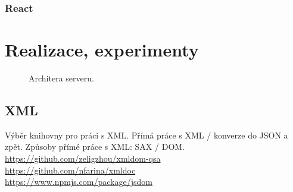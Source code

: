 \subsection{React}

\chapter{Realizace, experimenty}
\begin{figure}[h]
	\centering
	\caption{Architera serveru.}\label{img:server-architektura}
\end{figure}

\section{XML}
Výběr knihovny pro práci s XML.
Přímá práce s XML / konverze do JSON a zpět.
Způsoby přímé práce s XML: SAX / DOM.
\url{https://github.com/zeligzhou/xmldom-qsa}\\
\url{https://github.com/nfarina/xmldoc}\\
\url{https://www.npmjs.com/package/jsdom}

